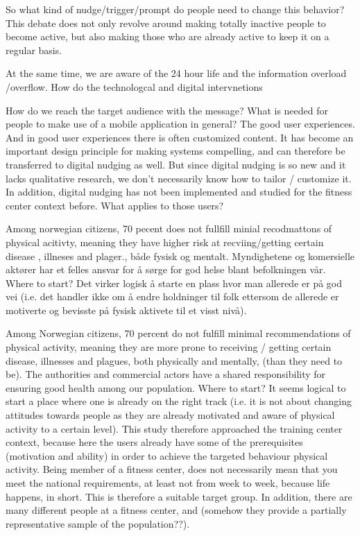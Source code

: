 
So what kind of nudge/trigger/prompt do people need to change this behavior? This debate does not only revolve around making totally inactive people to become active, but also making those who are already active to keep it on a regular basis. 

At the same time, we are aware of the 24 hour life and the information overload /overflow. How do the technologcal and digital intervnetions 

How do we reach the target audience with the message? What is needed for people to make use of a mobile application in general? The good user experiences. And in good user experiences there is often customized content. It has become an important design principle for making systems compelling, and can therefore be transferred to digital nudging as well. But since digital nudging is so new and it lacks qualitative research, we don't necessarily know how to tailor / customize it. In addition, digital nudging has not been implemented and studied for the fitness center context before. What applies to those users?

Among norwegian citizens, 70 pecent does not fullfill minial recodmattons of physical acitivty, meaning they have higher risk at recviing/getting certain disease , illneses and plager., både fysisk og mentalt. Myndighetene og komersielle aktører har et felles ansvar for å sørge for god helse blant befolkningen vår. Where to start? Det virker logisk å starte en plass hvor man allerede er på god vei (i.e. det handler ikke om å endre holdninger til folk ettersom de allerede er motiverte og bevisste på fysisk aktivete til et visst nivå). 

Among Norwegian citizens, 70 percent do not fulfill minimal recommendations of physical activity, meaning they are more prone to receiving / getting certain disease, illnesses and plagues, both physically and mentally, (than they need to be). The authorities and commercial actors have a shared responsibility for ensuring good health among our population. Where to start? It seems logical to start a place where one is already on the right track (i.e. it is not about changing attitudes towards people as they are already motivated and aware of physical activity to a certain level). This study therefore approached the training center  context, because here the users already have some of the prerequisites (motivation and ability) in order to achieve the targeted behaviour physical activity. Being member of a fitness center, does not necessarily mean that you meet the national requirements, at least not from week to week, because life happens, in short. This is therefore a suitable target group. In addition, there are many different people at a fitness center, and (somehow they provide a partially representative sample of the population??).

